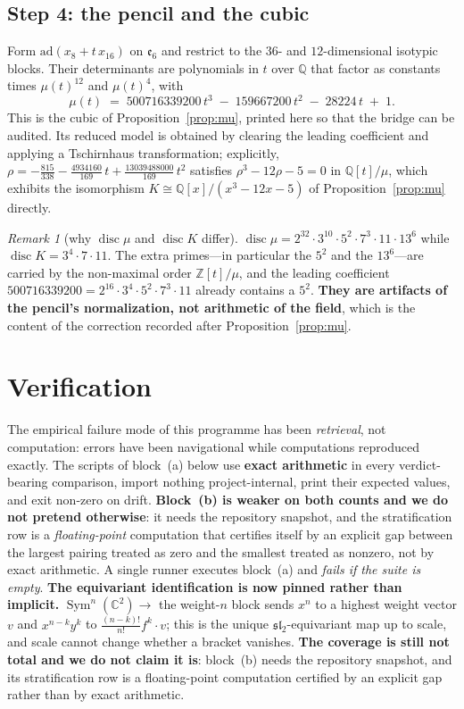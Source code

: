 \documentclass[11pt,reqno]{amsart}
\theoremstyle{plain}
\theoremstyle{definition}
\theoremstyle{remark}
\newtheorem{remark}[theorem]{Remark}
\newcommand{\Q}{\mathbb{Q}}
\newcommand{\Z}{\mathbb{Z}}
\newcommand{\C}{\mathbb{C}}
\newcommand{\sll}{\mathfrak{sl}}
\newcommand{\ee}{\mathfrak{e}}
\newcommand{\disc}{\operatorname{disc}}
\newcommand{\Sym}{\operatorname{Sym}}
\begin{document}
\subsection*{Step 4: the pencil and the cubic}
Form $\mathrm{ad}(x_8+t\,x_{16})$ on $\ee_6$ and restrict to the $36$- and
$12$-dimensional isotypic blocks. Their determinants are polynomials in $t$ over $\Q$
that factor as constants times $\mu(t)^{12}$ and $\mu(t)^{4}$, with
\[
   \mu(t)\;=\;500716339200\,t^{3}\;-\;159667200\,t^{2}\;-\;28224\,t\;+\;1 .
\]
This is the cubic of Proposition~\ref{prop:mu}, printed here so that the bridge can be
audited. Its reduced model is obtained by clearing the leading coefficient and applying
a Tschirnhaus transformation; explicitly, $\rho=-\tfrac{815}{338}
-\tfrac{4934160}{169}\,t+\tfrac{13039488000}{169}\,t^{2}$ satisfies
$\rho^{3}-12\rho-5=0$ in $\Q[t]/\mu$, which exhibits the isomorphism
$K\cong\Q[x]/(x^{3}-12x-5)$ of Proposition~\ref{prop:mu} directly.

\begin{remark}[why $\disc\mu$ and $\disc K$ differ]
$\disc\mu=2^{32}\cdot3^{10}\cdot5^{2}\cdot7^{3}\cdot11\cdot13^{6}$ while
$\disc K=3^{4}\cdot7\cdot11$. The extra primes---in particular the $5^2$ and the
$13^6$---are carried by the non-maximal order $\Z[t]/\mu$, and the leading coefficient
$500716339200=2^{16}\cdot3^{4}\cdot5^{2}\cdot7^{3}\cdot11$ already contains a $5^2$.
\textbf{They are artifacts of the pencil's normalization, not arithmetic of the field},
which is the content of the correction recorded after Proposition~\ref{prop:mu}.
\end{remark}

\section{Verification}\label{app:verify}

The empirical failure mode of this programme has been \emph{retrieval}, not computation:
errors have been navigational while computations reproduced exactly. The scripts of
block~(a) below use \textbf{exact arithmetic} in every verdict-bearing comparison,
import nothing project-internal, print their expected values, and exit non-zero on
drift. \textbf{Block~(b) is weaker on both counts and we do not pretend otherwise}: it
needs the repository snapshot, and the stratification row is a \emph{floating-point}
computation that certifies itself by an explicit gap between the largest pairing treated
as zero and the smallest treated as nonzero, not by exact arithmetic. A single runner executes block~(a) and
\emph{fails if the suite is empty}. \textbf{The equivariant identification is now pinned rather than implicit.}
$\Sym^n(\C^2)\to$ the weight-$n$ block sends $x^n$ to a highest weight vector $v$ and
$x^{n-k}y^k$ to $\tfrac{(n-k)!}{n!}f^k\!\cdot\!v$; this is the unique $\sll_2$-equivariant
map up to scale, and scale cannot change whether a bracket vanishes.
\textbf{The coverage is still not total and we do not claim
it is}: block~(b) needs the repository snapshot, and its stratification row is a
floating-point computation certified by an explicit gap rather than by exact arithmetic.
\end{document}
